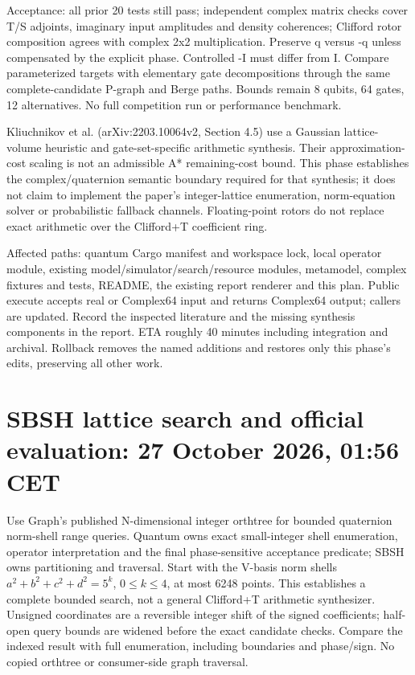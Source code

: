 \documentclass{article}
\begin{document}
Acceptance: all prior 20 tests still pass; independent complex matrix checks
cover T/S adjoints, imaginary input amplitudes and density coherences; Clifford
rotor composition agrees with complex 2x2 multiplication. Preserve q versus -q
unless compensated by the explicit phase. Controlled -I must differ from I.
Compare parameterized targets with elementary gate decompositions through the
same complete-candidate P-graph and Berge paths. Bounds remain 8 qubits, 64 gates,
12 alternatives. No full competition run or performance benchmark.

Kliuchnikov et al. (arXiv:2203.10064v2, Section 4.5) use a Gaussian lattice-volume
heuristic and gate-set-specific arithmetic synthesis. Their approximation-cost
scaling is not an admissible A* remaining-cost bound. This phase establishes the
complex/quaternion semantic boundary required for that synthesis; it does not
claim to implement the paper's integer-lattice enumeration, norm-equation solver
or probabilistic fallback channels. Floating-point rotors do not replace exact
arithmetic over the Clifford+T coefficient ring.

Affected paths: quantum Cargo manifest and workspace lock, local operator module,
existing model/simulator/search/resource modules, metamodel, complex fixtures and
tests, README, the existing report renderer and this plan. Public execute accepts
real or Complex64 input and returns Complex64 output; callers are updated. Record
the inspected literature and the missing synthesis components in the report.
ETA roughly 40 minutes including integration and archival. Rollback removes the
named additions and restores only this phase's edits, preserving all other work.
\section*{SBSH lattice search and official evaluation: 27 October 2026, 01:56 CET}
Use Graph's published N-dimensional integer orthtree for bounded quaternion
norm-shell range queries. Quantum owns exact small-integer shell enumeration,
operator interpretation and the final phase-sensitive acceptance predicate;
SBSH owns partitioning and traversal. Start with the V-basis norm shells
$a^2+b^2+c^2+d^2=5^k$, $0\leq k\leq4$, at most 6248 points. This establishes a
complete bounded search, not a general Clifford+T arithmetic synthesizer.
Unsigned coordinates are a reversible integer shift of the signed coefficients;
half-open query bounds are widened before the exact candidate checks. Compare
the indexed result with full enumeration, including boundaries and phase/sign.
No copied orthtree or consumer-side graph traversal.
\end{document}
